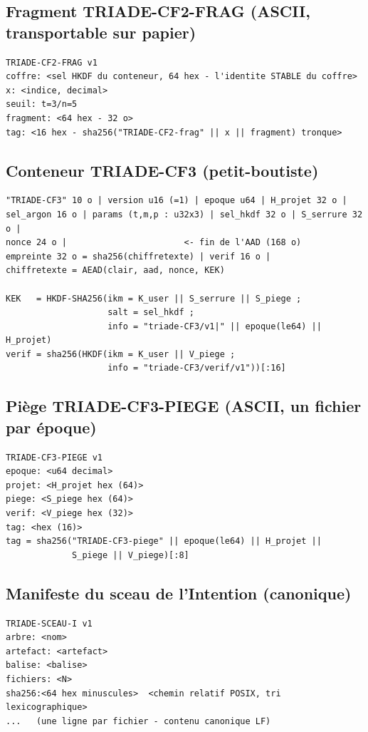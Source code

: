 \subsection{Fragment TRIADE-CF2-FRAG (ASCII, transportable sur papier)}

\begin{lstlisting}
TRIADE-CF2-FRAG v1
coffre: <sel HKDF du conteneur, 64 hex - l'identite STABLE du coffre>
x: <indice, decimal>
seuil: t=3/n=5
fragment: <64 hex - 32 o>
tag: <16 hex - sha256("TRIADE-CF2-frag" || x || fragment) tronque>
\end{lstlisting}

\subsection{Conteneur TRIADE-CF3 (petit-boutiste)}

\begin{lstlisting}
"TRIADE-CF3" 10 o | version u16 (=1) | epoque u64 | H_projet 32 o |
sel_argon 16 o | params (t,m,p : u32x3) | sel_hkdf 32 o | S_serrure 32 o |
nonce 24 o |                       <- fin de l'AAD (168 o)
empreinte 32 o = sha256(chiffretexte) | verif 16 o |
chiffretexte = AEAD(clair, aad, nonce, KEK)

KEK   = HKDF-SHA256(ikm = K_user || S_serrure || S_piege ;
                    salt = sel_hkdf ;
                    info = "triade-CF3/v1|" || epoque(le64) || H_projet)
verif = sha256(HKDF(ikm = K_user || V_piege ;
                    info = "triade-CF3/verif/v1"))[:16]
\end{lstlisting}

\subsection{Piège TRIADE-CF3-PIEGE (ASCII, un fichier par époque)}

\begin{lstlisting}
TRIADE-CF3-PIEGE v1
epoque: <u64 decimal>
projet: <H_projet hex (64)>
piege: <S_piege hex (64)>
verif: <V_piege hex (32)>
tag: <hex (16)>
tag = sha256("TRIADE-CF3-piege" || epoque(le64) || H_projet ||
             S_piege || V_piege)[:8]
\end{lstlisting}

\subsection{Manifeste du sceau de l'Intention (canonique)}

\begin{lstlisting}
TRIADE-SCEAU-I v1
arbre: <nom>
artefact: <artefact>
balise: <balise>
fichiers: <N>
sha256:<64 hex minuscules>  <chemin relatif POSIX, tri lexicographique>
...   (une ligne par fichier - contenu canonique LF)
\end{lstlisting}

